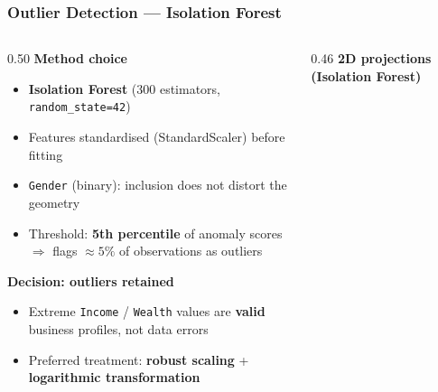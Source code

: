 \documentclass[aspectratio=169]{beamer}
\begin{document}
\begin{frame}
	\frametitle{Outlier Detection — Isolation Forest}
	\begin{columns}[T]
		\begin{column}{0.50\textwidth}
			\textbf{Method choice}
			\begin{itemize}
				\item \textbf{Isolation Forest} (300 estimators, \texttt{random\_state=42})
				\item Features standardised (StandardScaler) before fitting
				\item \texttt{Gender} (binary): inclusion does not distort the geometry
				\item Threshold: \textbf{5th percentile} of anomaly scores\\
				      $\Rightarrow$ flags $\approx 5\%$ of observations as outliers
			\end{itemize}
			\vspace{6pt}
			\textbf{Decision: outliers retained}
			\begin{itemize}
				\item Extreme \texttt{Income} / \texttt{Wealth} values are \textbf{valid} business profiles, not data errors
				\item Preferred treatment: \textbf{robust scaling} + \textbf{logarithmic transformation}
			\end{itemize}
		\end{column}
		\begin{column}{0.46\textwidth}
			\textbf{2D projections (Isolation Forest)}\\[4pt]
		\end{column}
	\end{columns}
\end{frame}
\end{document}

